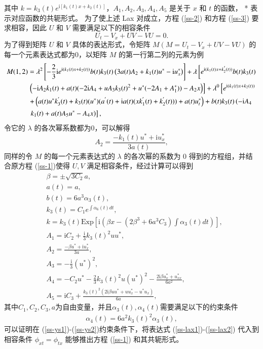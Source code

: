 其中 $k=k_{3}(t)e^{\mathrm{i}[k_{1}(t)x + k_{2}(t)]}$，$A_1, A_2, A_3, A_4, A_5$ 是关于 $x$ 和 $t$ 的函数，  * 表示对应函数的共轭形式。
为了使上述 Lax 对成立，方程 (\ref{ss-2}) 和方程 (\ref{ss-3}) 要求相容，因此 $U$ 和 $V$ 需要满足以下的相容条件
\begin{equation}
  U_t - V_x + UV - VU = 0.
\end{equation}
为了得到矩阵 $U$ 和 $V$ 具体的表达形式，令矩阵 $M (M = U_t - V_x + UV - VU)$ 的每一个元素表达式都为0，以矩阵 $M$ 的第一行第二列的元素为例
\begin{align}
  M(1,2)&=  \lambda^2\left[-\frac{2}{3}\mathrm{i}e^{\mathrm{i}(k_1(t)x+k_2(t))}b(t)k_3(t)\left(3a(t)A_2+k_1(t)u^*-\mathrm{i}u^*_x\right)\right] + \lambda \left[e^{\mathrm{i}(k_1(t)x+ k_2^{'}(t))}b(t)k_3(t) \right.  \notag\\
  & \left. \left(-\mathrm{i}A_2k_1(t)+a(t)(-2\mathrm{i}A_4+uA_3k_3(t)^2+u^*(-2A_1+A_1^*))-A_2x\right)\right] + \lambda^0 \left[e^{\mathrm{i}(k_1(t)x+k_2(t))} \right. \notag \\
  & \left. + \left(a(t)u^*k_3^{'}(t)+k_3(t)(u^*)(a^{'}(t)+ \mathrm{i}a(t)(xk_1^{'}(t)+ k_2^{'}(t)))+a(t)u^*_t\right)+b(t)k_3(t)\left(-\mathrm{i}A_4 \right. \right. \notag \\
  & \left. \left.k_1(t) +a(t)A_5u^*-A_4x\right)\right],
\end{align}
令它的 $\lambda$ 的各次幂系数都为0，可以解得
\begin{equation}
  A_2 = \frac{-k_1(t)u^*+\mathrm{i}u^*_x}{3a(t)},
\end{equation}
同样的令 $M$ 的每一个元素表达式的 $\lambda$ 的各次幂的系数为 0 得到的方程组，并结合原方程 (\ref{ss-1})使得 $U, V$ 满足相容条件，经过计算可以得到
\begin{align}
  & \beta = \pm \sqrt{3C_{2}}a, \label{ss-ys1}\\
  & a(t) = a, \\
  & b(t) = 6a^{3}\alpha_{3}(t), \\
  & k_{3}(t) = C_1e^{\int \alpha_{6}(t)dt},   \\
  & k = k_{3}(t)\mathrm{Exp}\left[\mathrm{i}\left(\beta x - (2\beta^{3} + 6a^{3}C_{3})\int \alpha_{3}(t)dt \right)\right], \\
  & A_{1} = \mathrm{i}C_{2} + \frac{\mathrm{i}}{3}k_{3}(t)^{2}uu^{*}, \\
  & A_{2} = \frac{-\beta u^{*} + \mathrm{i}u^{*}_{x}}{3a},   \\
  & A_{3} = -\frac{\mathrm{i}}{3}(u^{*})^{2},  \\
  & A_{4} = -C_{2}u^{*} - \frac{2}{3}k_{3}(t)^{2}u(u^{*})^{2} - \frac{2\mathrm{i}\beta u^{*}_{x} + u^{*}_{xx}}{6a^{2}}, \\
  & A_{5} = \mathrm{i}C_{3} + \frac{k_{3}(t)^{2}(2\mathrm{i}\beta uu^{*} + uu^{*}_{x} - u^{*}u_{x})}{6a}, \label{ss-ys2}
\end{align}
其中$C_1, C_{2}, C_{3}, a$为自由变量，并且$\alpha_{3}(t), \alpha_{4}(t)$需要满足以下的约束条件
\begin{align}
  \alpha_{4}(t) = 6a^{2}k_{3}(t)^{2}\alpha_{3}(t),
\end{align}
可以证明在 (\ref{ss-ys1})-(\ref{ss-ys2})约束条件下，将表达式 (\ref{ss-lax1})-(\ref{ss-lax2}) 代入到相容条件  $\phi_{xt} = \phi_{tx}$ 能够推出方程 (\ref{ss-1}) 和其共轭形式。


